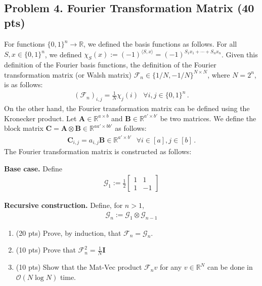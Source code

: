 \documentclass[12pt]{article}
\theoremstyle{plain}
\theoremstyle{definition}
\newcommand{\R}{\mathbb{R}}
\newcommand{\mat}[1]{\mathbf{#1}}
\begin{document}
 \newline
\   %
\newpage
\subsection*{Problem 4. Fourier Transformation Matrix (40 pts)}
For functions $\{0, 1\}^n \rightarrow \R$, we defined the basis functions as follows. For all $S, x \in \{0, 1\}^n$, we defined $\chi_S(x):=(-1)^{\langle S,x\rangle}=(-1)^{S_1x_1 + \cdots + S_n x_n}$. Given this definition of the Fourier basis functions, the definition of the Fourier transformation matrix (or Walsh matrix) $\mathcal{F}_n\in \{1/N, -1/N\}^{N\times N}$, where $N=2^n$, is as follows:
\begin{align*}
    (\mathcal{F}_n)_{i,j}=\frac{1}{N}\chi_j(i)~~~\forall i,j\in \{0,1\}^n\,.
\end{align*}
On the other hand, the Fourier transformation matrix can be defined using the Kronecker product. Let $\mat{A}\in \R^{a\times b}$ and $\mat{B}\in \R^{a'\times b'}$ be two matrices. We define the block matrix $\mat{C} = \mat{A} \otimes \mat{B}\in \R^{aa'\times bb'}$ as follows:
\begin{align*}
    \mat{C}_{i,j}=a_{i,j} \mat{B}\in \R^{a'\times b'}~~~\forall i\in [a],j\in [b]\,.
\end{align*}
The Fourier transformation matrix is constructed as follows:

\textbf{Base case.} Define
\begin{align*}
    \mathcal{G}_1:=\frac{1}{2}\begin{bmatrix}
        1 & 1\\
        1 & -1
    \end{bmatrix}
\end{align*}

\textbf{Recursive construction.} Define, for $n > 1$, 
\begin{align*}
    \mathcal{G}_n:=\mathcal{G}_1\otimes \mathcal{G}_{n-1}
\end{align*}

\begin{enumerate}
    \item (20 pts) Prove, by induction, that $\mathcal{F}_n=\mathcal{G}_n$.
    \item (10 pts) Prove that $\mathcal{F}_n^2 = \frac{1}{N} \mat{I}$
    \item (10 pts) Show that the Mat-Vec product $\mathcal{F}_n v$ for any $v\in \R^N$ can be done in $\mathcal{O}(N \log N)$ time.
\end{enumerate}

 \newline
\   %
\newpage
\end{document}
